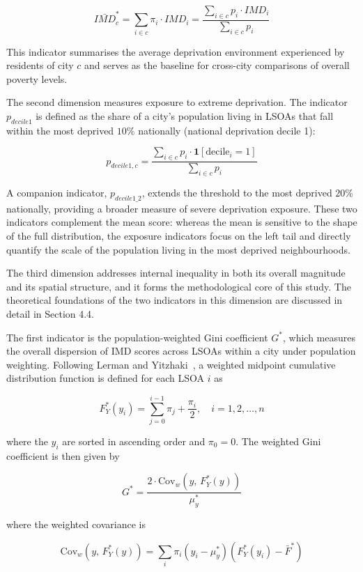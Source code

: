 \documentclass[11pt,journal,compsoc]{IEEEtran}
\begin{document}
$$\bar{IMD}^{*}_{c} = \sum_{i \in c} \pi_i \cdot IMD_i = \frac{\sum_{i \in c} p_i \cdot IMD_i}{\sum_{i \in c} p_i}$$

This indicator summarises the average deprivation environment experienced by residents of city $c$ and serves as the baseline for cross-city comparisons of overall poverty levels.

The second dimension measures exposure to extreme deprivation. The indicator $p_{decile1}$ is defined as the share of a city's population living in LSOAs that fall within the most deprived $10\%$ nationally (national deprivation decile 1):

$$p_{decile1,c} = \frac{\sum_{i \in c} p_i \cdot \mathbf{1}[\text{decile}_i = 1]}{\sum_{i \in c} p_i}$$

A companion indicator, $p_{decile1\_2}$, extends the threshold to the most deprived $20\%$ nationally, providing a broader measure of severe deprivation exposure. These two indicators complement the mean score: whereas the mean is sensitive to the shape of the full distribution, the exposure indicators focus on the left tail and directly quantify the scale of the population living in the most deprived neighbourhoods.

The third dimension addresses internal inequality in both its overall magnitude and its spatial structure, and it forms the methodological core of this study. The theoretical foundations of the two indicators in this dimension are discussed in detail in Section 4.4.

The first indicator is the population-weighted Gini coefficient $G^*$, which measures the overall dispersion of IMD scores across LSOAs within a city under population weighting. Following Lerman and Yitzhaki~\cite{lerman1989improving}, a weighted midpoint cumulative distribution function is defined for each LSOA $i$ as

$$F^*_Y(y_i) = \sum_{j=0}^{i-1} \pi_j + \frac{\pi_i}{2}, \quad i = 1, 2, \ldots, n$$

where the $y_i$ are sorted in ascending order and $\pi_0 = 0$. The weighted Gini coefficient is then given by ~\cite[Eq.~11]{panzera2020measuring}

$$G^* = \frac{2 \cdot \text{Cov}_w\!\left(y,\, F^*_Y(y)\right)}{\mu^*_y}$$

where the weighted covariance is

$$\text{Cov}_w\!\left(y,\, F^*_Y(y)\right) = \sum_i \pi_i \left(y_i - \mu^*_y\right)\left(F^*_Y(y_i) - \bar{F}^*\right)$$
\end{document}
